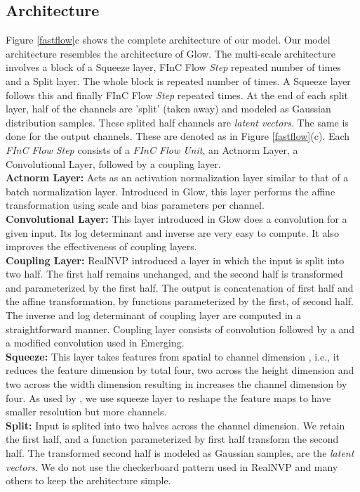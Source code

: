 \documentclass[a4paper,twoside]{article}
\theoremstyle{definition}
\begin{document}
\subsection{Architecture}\label{subsec:arch}
Figure \ref{fastflow}c shows the complete architecture of our model. Our model architecture resembles the architecture of Glow. The multi-scale architecture involves a block of a Squeeze layer, FInC Flow \emph{Step} repeated  number of times and a Split layer. The whole block is repeated  number of times. A Squeeze layer follows this and finally FInC Flow \emph{Step} repeated  times.
At the end of each split layer, half of the channels are 'split' (taken away) and modeled as Gaussian distribution samples. These splited half channels are \emph{latent vectors}. The same is done for the output channels. These are denoted as  in Figure \ref{fastflow}(c). 
Each \emph{FInC Flow Step} consists of a \emph{FInC Flow Unit}, an Actnorm Layer, a  Convolutional Layer, followed by a coupling layer. \\
\textbf{Actnorm Layer:} Acts as an activation normalization layer similar to that of a batch normalization layer. Introduced in Glow, this layer performs the affine transformation using scale and bias parameters per channel. 
\\
\textbf{ Convolutional Layer:} This layer introduced in Glow does a  convolution for a given input. Its log determinant and inverse are very easy to compute. It also improves the effectiveness of coupling layers.
\\
\textbf{Coupling Layer:} RealNVP introduced a layer in which the input is split into two  half. The first half remains unchanged, and the second half is transformed and parameterized by the first half. The output is concatenation of first half and the affine transformation, by functions parameterized by the first, of second half. The inverse and log determinant of coupling layer are computed in a straightforward manner. Coupling layer consists of  convolution followed by a  and a modified  convolution used in Emerging.
\\
\textbf{Squeeze:} This layer takes features from spatial to channel dimension \citep{behrmann2019invertible}, i.e., it reduces the feature dimension by total four, two across the height dimension and two across the width dimension resulting in increases the channel dimension by four. As used by \citep{dinh2016density}, we use squeeze layer to reshape the feature maps to have smaller resolution but more channels.
\\
\textbf{Split:} Input is splited into two halves across the channel dimension. We retain the first half, and a function parameterized by first half transform the second half. The transformed second half is modeled as Gaussian samples, are the \emph{latent vectors}. We do not use the checkerboard pattern used in RealNVP \citep{dinh2016density} and many others to keep the architecture simple.
\end{document}

